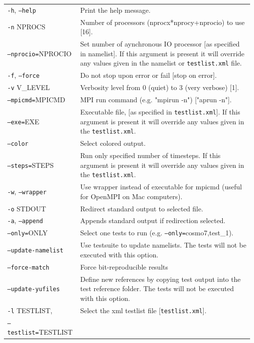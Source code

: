 \documentclass[12pt,twoside,a4paper]{report}
\begin{document}
\begin{longtable}{lp{10cm}}
\texttt{-h}, \texttt{--help} & Print the help message.\\[1.2ex]
\texttt{-n} NPROCS & Number of processors (nprocx*nprocy+nprocio) to use [16].\\[1.2ex]
\texttt{--nprocio=}NPROCIO & Set number of aynchronous IO processor [as specified in namelist]. If this argument is present it will override any values given in the namelist or \texttt{testlist.xml} file.\\[1.2ex]
\texttt{-f}, \texttt{--force} & Do not stop upon error or fail [stop on error].\\[1.2ex]
\texttt{-v} V\_LEVEL & Verbosity level from 0 (quiet) to 3 (very verbose) [1].\\[1.2ex]
\texttt{--mpicmd=}MPICMD & MPI run command (e.g. "mpirun -n") ["aprun -n"].\\[1.2ex]
\texttt{--exe=}EXE & Executable file, [as specified in \texttt{testlist.xml}]. If this argument is present it will override any values given in the \texttt{testlist.xml}.\\[1.2ex]
\texttt{--color} & Select colored output.\\[1.2ex]
\texttt{--steps=}STEPS & Run only specified number of timesteps. If this argument is present it will override any values given in the \texttt{testlist.xml}.\\[1.2ex]
\texttt{-w}, \texttt{--wrapper} & Use wrapper instead of executable for mpicmd (useful for OpenMPI on Mac computers).\\[1.2ex]
\texttt{-o} STDOUT & Redirect standard output to selected file.\\[1.2ex]
\texttt{-a}, \texttt{--append} & Appends standard output if redirection selected.\\[1.2ex]
\texttt{--only=}ONLY & Select one tests to run (e.g. \texttt{--only=}cosmo7,test\_1).\\[1.2ex]
\texttt{--update-namelist} & Use testsuite to update namelists. The tests will not be executed with this option.\\[1.2ex]
\texttt{--force-match} & Force bit-reproducible results\\[1.2ex]
\texttt{--update-yufiles} & Define new references by copying test output into the test reference folder. The tests will not be executed with this option.\\[1.2ex] 
\texttt{-l} TESTLIST, & Select the xml testlist file [\texttt{testlist.xml}].\\
\texttt{--testlist=}TESTLIST & \\[1.2ex]

\end{longtable}
\end{document}
